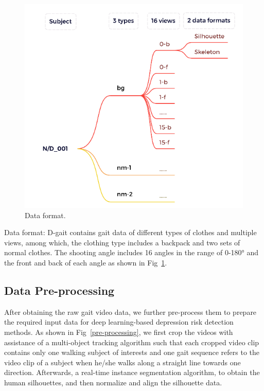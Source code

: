 \documentclass[10pt,twocolumn,letterpaper]{article}
\begin{document}
\begin{figure}[t]
  \centering
   \includegraphics[width=1.0\linewidth]{figures/Data format.png}

   \caption{Data format.
   }
   \label{Data format}
\end{figure}

Data format:
D-gait contains gait data of different types of clothes and multiple views, among which, the clothing type includes a backpack and two sets of normal clothes.
The shooting angle includes 16 angles in the range of 0-180° and the front and back of each angle as shown in Fig~\ref{Data format}.

\subsection{Data Pre-processing}

After obtaining the raw gait video data, we further pre-process them to prepare the required input data for  deep learning-based depression risk detection methods.
As shown in Fig~\ref{pre-processing}, we first crop the videos with assistance of a multi-object tracking algorithm such that each cropped video clip contains only one walking subject of interests and one gait sequence refers to the video clip of a subject when he/she walks along a straight line towards one direction.
Afterwards,  a real-time instance segmentation algorithm, to obtain the human silhouettes, and then normalize and align the silhouette data.
\end{document}
